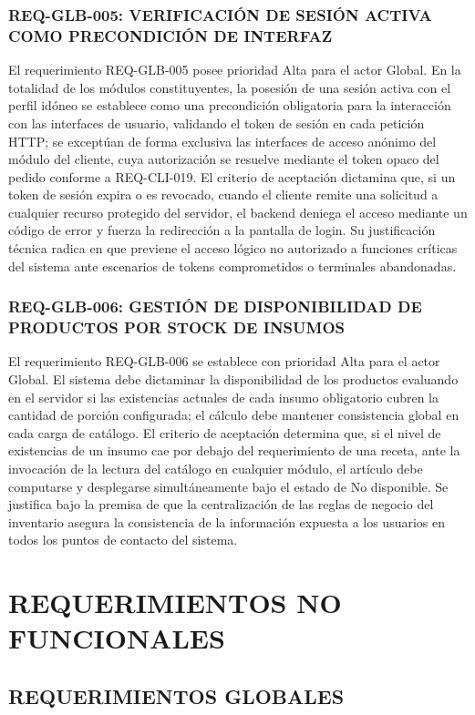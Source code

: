 \subsubsection{REQ-GLB-005: VERIFICACIÓN DE SESIÓN ACTIVA COMO PRECONDICIÓN DE INTERFAZ}
El requerimiento REQ-GLB-005 posee prioridad Alta para el actor Global. En la totalidad de los módulos constituyentes, la posesión de una sesión activa con el perfil idóneo se establece como una precondición obligatoria para la interacción con las interfaces de usuario, validando el token de sesión en cada petición HTTP; se exceptúan de forma exclusiva las interfaces de acceso anónimo del módulo del cliente, cuya autorización se resuelve mediante el token opaco del pedido conforme a REQ-CLI-019. El criterio de aceptación dictamina que, si un token de sesión expira o es revocado, cuando el cliente remite una solicitud a cualquier recurso protegido del servidor, el backend deniega el acceso mediante un código de error y fuerza la redirección a la pantalla de login. Su justificación técnica radica en que previene el acceso lógico no autorizado a funciones críticas del sistema ante escenarios de tokens comprometidos o terminales abandonadas.

\subsubsection{REQ-GLB-006: GESTIÓN DE DISPONIBILIDAD DE PRODUCTOS POR STOCK DE INSUMOS}
El requerimiento REQ-GLB-006 se establece con prioridad Alta para el actor Global. El sistema debe dictaminar la disponibilidad de los productos evaluando en el servidor si las existencias actuales de cada insumo obligatorio cubren la cantidad de porción configurada; el cálculo debe mantener consistencia global en cada carga de catálogo. El criterio de aceptación determina que, si el nivel de existencias de un insumo cae por debajo del requerimiento de una receta, ante la invocación de la lectura del catálogo en cualquier módulo, el artículo debe computarse y desplegarse simultáneamente bajo el estado de No disponible. Se justifica bajo la premisa de que la centralización de las reglas de negocio del inventario asegura la consistencia de la información expuesta a los usuarios en todos los puntos de contacto del sistema.

\section{REQUERIMIENTOS NO FUNCIONALES}
\subsection{REQUERIMIENTOS GLOBALES}
